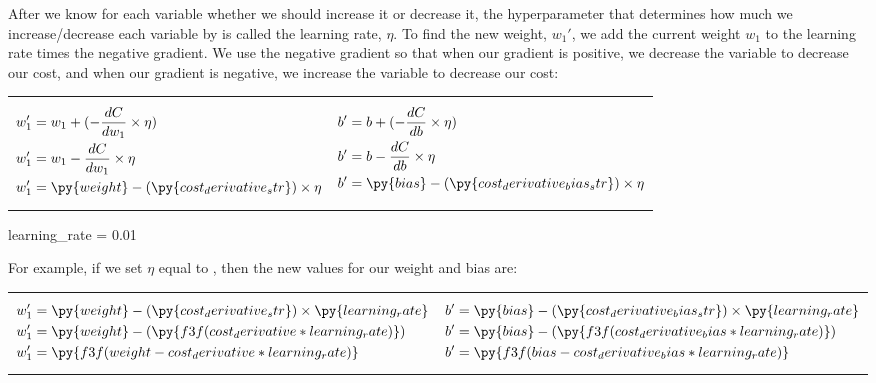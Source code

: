 \documentclass[12pt, demo]{article}
\begin{document}
After we know for each variable whether we should increase it or decrease it, the hyperparameter that determines how much we increase/decrease each variable by is called the learning rate, $\eta$. To find the new weight, $w_1'$, we add the current weight $w_1$ to the learning rate times the negative gradient. We use the negative gradient so that when our gradient is positive, we decrease the variable to decrease our cost, and when our gradient is negative, we increase the variable to decrease our cost:
{
\setlength{\abovedisplayskip}{0pt}
\setlength{\belowdisplayskip}{0pt}
\begin{center}
	\noindent\begin{tabularx}{0.8\linewidth}{X X}
		\vbox{
			\begin{align*}
				w_1' & = w_1 + (-\frac{dC}{dw_1} \times \eta)
				\\
				w_1' & = w_1 - \frac{dC}{dw_1} \times \eta
				\\
				w_1' & = \py{weight} - (\py{cost_derivative_str}) \times \eta
			\end{align*}
		}
		 &
		\vbox{
			\begin{align*}
				b' & = b + (-\frac{dC}{db} \times \eta)
				\\
				b' & = b - \frac{dC}{db} \times \eta
				\\
				b' & = \py{bias} - (\py{cost_derivative_bias_str}) \times \eta
			\end{align*}
		}
	\end{tabularx}
\end{center}
}

\begin{pycode}
learning_rate = 0.01
\end{pycode}

{
\setlength{\abovedisplayskip}{0pt}
\setlength{\belowdisplayskip}{0pt}
For example, if we set $\eta$ equal to , then the new values for our weight and bias are:
\begin{center}
	\begin{tabularx}{0.8\linewidth}{X X}
		\vbox{
			\begin{align*}
				w_1' & = \py{weight} - (\py{cost_derivative_str}) \times \py{learning_rate}
				\\
				w_1' & = \py{weight} - (\py{f3f(cost_derivative * learning_rate)})
				\\
				w_1' & = \py{f3f(weight - cost_derivative * learning_rate)}
			\end{align*}
		} &
		\vbox{
			\begin{align*}
				b' & = \py{bias} - (\py{cost_derivative_bias_str}) \times \py{learning_rate}
				\\
				b' & = \py{bias} - (\py{f3f(cost_derivative_bias * learning_rate)})
				\\
				b' & = \py{f3f(bias - cost_derivative_bias * learning_rate)}
			\end{align*}
		}
	\end{tabularx}
\end{center}
}
\end{document}
